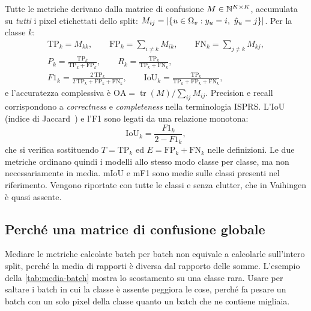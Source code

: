 Tutte le metriche derivano dalla matrice di confusione $M\in\mathbb{N}^{K\times K}$, accumulata su
\emph{tutti} i pixel etichettati dello split:
$M_{ij}=\left\lvert \{u\in\Omega_v : y_u=i,\ \hat y_u=j\} \right\rvert$. Per la classe $k$:
\begin{gather}
  \mathrm{TP}_k=M_{kk},\qquad
  \mathrm{FP}_k=\sum_{i\neq k}M_{ik},\qquad
  \mathrm{FN}_k=\sum_{j\neq k}M_{kj},\nonumber\\
  P_k=\frac{\mathrm{TP}_k}{\mathrm{TP}_k+\mathrm{FP}_k},\qquad
  R_k=\frac{\mathrm{TP}_k}{\mathrm{TP}_k+\mathrm{FN}_k},\nonumber\\
  F1_k=\frac{2\,\mathrm{TP}_k}{2\,\mathrm{TP}_k+\mathrm{FP}_k+\mathrm{FN}_k},\qquad
  \mathrm{IoU}_k=\frac{\mathrm{TP}_k}{\mathrm{TP}_k+\mathrm{FP}_k+\mathrm{FN}_k},
  \label{eq:metriche}
\end{gather}
e l'accuratezza complessiva è $\mathrm{OA}=\operatorname{tr}(M)/\sum_{ij}M_{ij}$. Precision e
recall corrispondono a \emph{correctness} e \emph{completeness} nella terminologia ISPRS.
L'IoU (indice di Jaccard~\cite{everingham2010pascal}) e l'F1 sono legati da una relazione
monotona:
\begin{equation}
  \mathrm{IoU}_k=\frac{F1_k}{2-F1_k},
\end{equation}
che si verifica sostituendo $T=\mathrm{TP}_k$ ed $E=\mathrm{FP}_k+\mathrm{FN}_k$ nelle
definizioni. Le due metriche ordinano quindi i modelli allo stesso modo classe per classe, ma
non necessariamente in media. mIoU e mF1 sono medie sulle classi presenti nel riferimento.
Vengono riportate con tutte le classi e senza clutter, che in Vaihingen è quasi assente.

\subsection{Perché una matrice di confusione globale}

Mediare le metriche calcolate batch per batch non equivale a calcolarle sull'intero split,
perché la media di rapporti è diversa dal rapporto delle somme. L'esempio della
\cref{tab:media-batch} mostra lo scostamento su una classe rara. Usare  per
saltare i batch in cui la classe è assente peggiora le cose, perché fa pesare un batch con un
solo pixel della classe quanto un batch che ne contiene migliaia.

